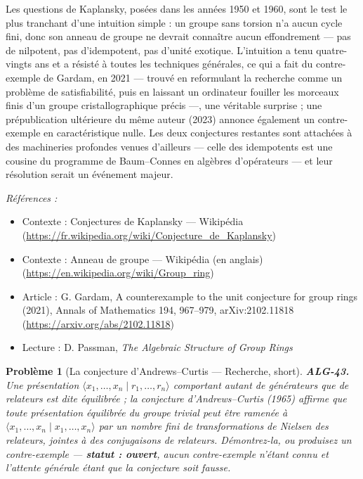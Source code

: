 \documentclass[11pt]{article}
\newtheorem{problem}{Problème}
\newenvironment{refs}{\par\small\noindent\emph{Références :}\begin{itemize}\setlength\itemsep{0pt}}{\end{itemize}\normalsize}
\begin{document}
\noindent Les questions de Kaplansky, posées dans les années 1950 et 1960, sont le test le plus
tranchant d'une intuition simple : un groupe sans torsion n'a aucun cycle fini, donc son anneau de groupe ne
devrait connaître aucun \og{} effondrement \fg{} --- pas de nilpotent, pas d'idempotent, pas d'unité exotique.
L'intuition a tenu quatre-vingts ans et a résisté à toutes les techniques générales, ce qui a fait du
contre-exemple de Gardam, en 2021 --- trouvé en reformulant la recherche comme un problème de satisfiabilité,
puis en laissant un ordinateur fouiller les morceaux finis d'un groupe cristallographique précis ---, une
véritable surprise ; une prépublication ultérieure du même auteur (2023) annonce également un contre-exemple
en caractéristique nulle. Les deux conjectures restantes sont attachées à des machineries profondes venues
d'ailleurs --- celle des idempotents est une cousine du programme de Baum--Connes en algèbres d'opérateurs --- et
leur résolution serait un événement majeur.

\begin{refs}
\item Contexte : Conjectures de Kaplansky --- Wikipédia (\url{https://fr.wikipedia.org/wiki/Conjecture_de_Kaplansky})
\item Contexte : Anneau de groupe --- Wikipédia (en anglais) (\url{https://en.wikipedia.org/wiki/Group_ring})
\item Article : G. Gardam, \og{} A counterexample to the unit conjecture for group rings \fg{} (2021), Annals of Mathematics 194, 967--979, arXiv:2102.11818 (\url{https://arxiv.org/abs/2102.11818})
\item Lecture : D. Passman, \textit{The Algebraic Structure of Group Rings}
\end{refs}

\bigskip

\begin{problem}[{La conjecture d'Andrews--Curtis --- Recherche, short}]
\textbf{ALG-43.} Une présentation $\langle x_1, \dots, x_n \mid r_1, \dots,
r_n \rangle$ comportant autant de générateurs que de relateurs est dite \textit{équilibrée} ; la conjecture
d'Andrews--Curtis (1965) affirme que toute présentation équilibrée du groupe trivial peut être ramenée à
$\langle x_1, \dots, x_n \mid x_1, \dots, x_n \rangle$ par un nombre fini de transformations de Nielsen
des relateurs, jointes à des conjugaisons de relateurs. Démontrez-la, ou produisez un contre-exemple ---
\textbf{statut : ouvert}, aucun contre-exemple n'étant connu et l'attente générale étant que la
conjecture soit fausse.
\end{problem}
\end{document}
